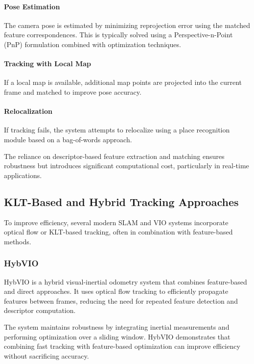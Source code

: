 \documentclass[english, cd=nocolor, cdfont=off, fontsize=11pt]{tudscrreprt}
\begin{document}
\paragraph{Pose Estimation}
The camera pose is estimated by minimizing reprojection error using the matched feature correspondences. This is typically solved using a Perspective-n-Point (PnP) formulation combined with optimization techniques.

\paragraph{Tracking with Local Map}
If a local map is available, additional map points are projected into the current frame and matched to improve pose accuracy.

\paragraph{Relocalization}
If tracking fails, the system attempts to relocalize using a place recognition module based on a bag-of-words approach.

The reliance on descriptor-based feature extraction and matching ensures robustness but introduces significant computational cost, particularly in real-time applications.

\subsection{KLT-Based and Hybrid Tracking Approaches}

To improve efficiency, several modern SLAM and VIO systems incorporate optical flow or KLT-based tracking, often in combination with feature-based methods.

\subsubsection{HybVIO}

HybVIO is a hybrid visual-inertial odometry system that combines feature-based and direct approaches. It uses optical flow tracking to efficiently propagate features between frames, reducing the need for repeated feature detection and descriptor computation.

The system maintains robustness by integrating inertial measurements and performing optimization over a sliding window. HybVIO demonstrates that combining fast tracking with feature-based optimization can improve efficiency without sacrificing accuracy.
\end{document}
